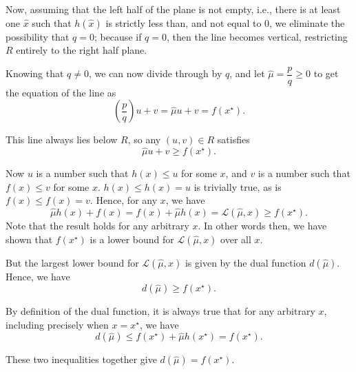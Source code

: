 \documentclass{article}[a4paper]
\begin{document}
\begin{enumerate}[label=(\alph*), ref=2.\alph*]
\begin{enumerate}[label=(\arabic*), ref=\theenumi.\arabic*]
            Now, assuming that the left half of the plane is not empty, i.e., there is at least one $\hat{x}$ such that $h\left( \hat{x} \right)$ is strictly less than, and not equal to $0$, we eliminate the possibility that $q = 0$; because if $q = 0$, then the line becomes vertical, restricting $R$ entirely to the right half plane.

            Knowing that $q \ne 0$, we can now divide through by $q$, and let $\hat{\mu} = \dfrac{p}{q} \geq 0$ to get the equation of the line as \[
                \left( \dfrac{p}{q} \right) u + v
                =
                \hat{\mu} u + v
                =
                f\left( x^\star \right).
            \]

            This line always lies below $R$, so any $\left( u, v \right) \in R$ satisfies \[
                \hat{\mu} u + v
                \geq
                f\left( x^\star \right).
            \]

            Now $u$ is a number such that $h\left( x \right) \leq u$ for some $x$, and $v$ is a number such that $f\left( x \right) \leq v$ for some $x$. $h\left( x \right) \leq h\left( x \right) = u$ is trivially true, as is $f\left( x \right) \leq f\left( x \right) = v$. Hence, for any $x$, we have \[
                \hat{\mu} h\left( x \right) + f\left( x \right)
                =
                f\left( x \right) + \hat{\mu} h\left( x \right)
                =
                \mathcal{L}\left( \hat{\mu}, x \right)
                \geq
                f\left( x^\star \right).
            \] Note that the result holds for any arbitrary $x$. In other words then, we have shown that $f\left( x^\star \right)$ is a lower bound for $\mathcal{L}\left( \hat{\mu}, x \right)$ over all $x$.
            
            But the largest lower bound for $\mathcal{L}\left( \hat{\mu}, x \right)$ is given by the dual function $d\left( \hat{\mu} \right)$. Hence, we have \[
                d\left( \hat{\mu} \right) \geq f\left( x^\star \right).
            \]

            By definition of the dual function, it is always true that for any arbitrary $x$, including precisely when $x = x^\star$, we have \[
                d\left( \hat{\mu} \right)
                \leq
                f\left( x^\star \right) + \hat{\mu} h\left( x^\star \right)
                =
                f\left( x^\star \right).
            \]
            
            These two inequalities together give $d\left( \hat{\mu} \right) = f\left( x^\star \right)$.


\end{enumerate}
\end{enumerate}
\end{document}
